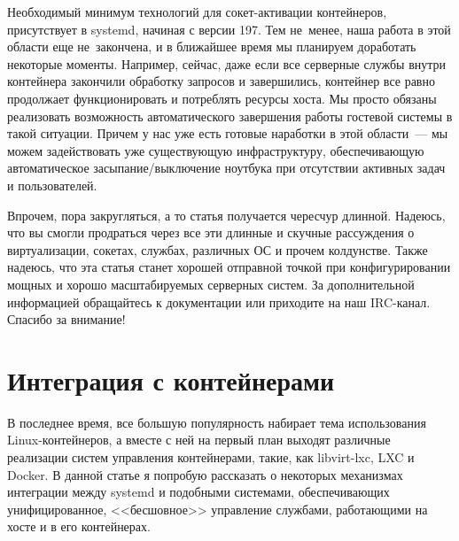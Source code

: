 \documentclass[10pt,oneside,a4paper]{article}
\begin{document}
Необходимый минимум технологий для сокет-активации контейнеров, присутствует в
systemd, начиная с версии 197. Тем не~менее, наша работа в этой области еще
не~закончена, и в ближайшее время мы планируем доработать некоторые моменты.
Например, сейчас, даже если все серверные службы внутри контейнера
закончили обработку запросов и завершились, контейнер все равно продолжает
функционировать и потреблять ресурсы хоста. Мы просто обязаны реализовать
возможность автоматического завершения работы гостевой системы в такой ситуации.
Причем у нас уже есть готовые наработки в этой области~--- мы можем
задействовать уже существующую инфраструктуру, обеспечивающую автоматическое
засыпание/выключение ноутбука при отсутствии активных задач и пользователей.

Впрочем, пора закругляться, а то статья получается чересчур длинной. Надеюсь,
что вы смогли продраться через все эти длинные и скучные рассуждения о
виртуализации, сокетах, службах, различных ОС и прочем колдунстве. Также
надеюсь, что эта статья станет хорошей отправной точкой при конфигурировании
мощных и хорошо масштабируемых серверных систем. За дополнительной информацией
обращайтесь к документации или приходите на наш IRC-канал. Спасибо за внимание!

\section{Интеграция с контейнерами}

В последнее время, все большую популярность набирает тема использования
Linux-контейнеров, а вместе с ней на первый план выходят различные реализации
систем управления контейнерами, такие, как libvirt-lxc, LXC и Docker. В данной
статье я попробую рассказать о некоторых механизмах интеграции между systemd и
подобными системами, обеспечивающих унифицированное, <<бесшовное>>
управление службами, работающими на хосте и в его контейнерах.
\end{document}
